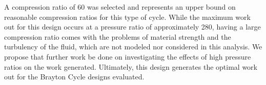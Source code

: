 \documentclass[
	12pt, %
]{brayton_cycle_report_style}
\begin{document}
A compression ratio of 60 was selected and represents an upper bound on reasonable compression ratios for this type of cycle. While the maximum work out for this design occurs at a pressure ratio of approximately 280, having a large compression ratio comes with the problems of material strength and the turbulency of the fluid, which are not modeled nor considered in this analysis.  We propose that further work be done on investigating the effects of high pressure ratios on the work generated. Ultimately, this design generates the optimal work out for the Brayton Cycle designs evaluated. 

\newpage
{}   %
\printbibliography[heading=bibintoc, title={References}]

\end{document}
